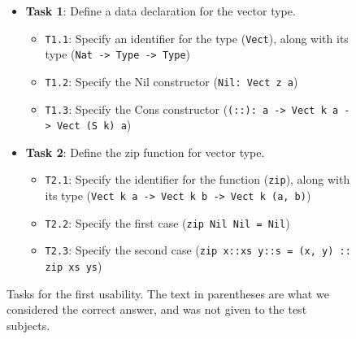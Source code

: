 \begin{figure}
\centering
\begin{itemize}
	\item \textbf{Task 1}: Define a data declaration for the vector type.
	\begin{itemize}
		\item \texttt{T1.1}: Specify an identifier for the type (\texttt{Vect}), along with its type (\texttt{Nat -> Type -> Type})
		\item \texttt{T1.2}: Specify the Nil constructor (\texttt{Nil: Vect z a})
		\item \texttt{T1.3}: Specify the Cons constructor (\texttt{(::): a -> Vect k a -> Vect (S k) a})
	\end{itemize}
	\item \textbf{Task 2}: Define the zip function for vector type.
	\begin{itemize}
		\item \texttt{T2.1}: Specify the identifier for the function (\texttt{zip}), along with its type (\texttt{Vect k a -> Vect k b -> Vect k (a, b)})
		\item \texttt{T2.2}: Specify the first case (\texttt{zip Nil Nil = Nil})
		\item \texttt{T2.3}: Specify the second case (\texttt{zip x::xs y::s = (x, y) :: zip xs ys})
	\end{itemize}
\end{itemize}
\caption{Tasks for the first usability. The text in parentheses are what we considered the correct answer, and was not given to the test subjects.}
\label{figure:first_tasks}
\end{figure}


